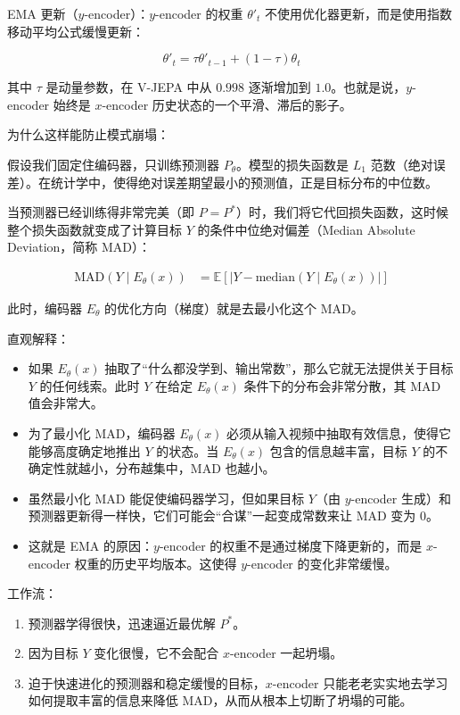 EMA 更新（\(y\)-encoder）：\(y\)-encoder 的权重 \(\theta'_t\) 不使用优化器更新，而是使用指数移动平均公式缓慢更新：

\[
\theta'_t=\tau\theta'_{t-1}+(1-\tau)\theta_t
\]

其中 \(\tau\) 是动量参数，在 V-JEPA 中从 \(0.998\) 逐渐增加到 \(1.0\)。也就是说，\(y\)-encoder 始终是 \(x\)-encoder 历史状态的一个平滑、滞后的影子。

为什么这样能防止模式崩塌：

假设我们固定住编码器，只训练预测器 \(P_\theta\)。模型的损失函数是 \(L_1\) 范数（绝对误差）。在统计学中，使得绝对误差期望最小的预测值，正是目标分布的中位数。

当预测器已经训练得非常完美（即 \(P=P^{*}\)）时，我们将它代回损失函数，这时候整个损失函数就变成了计算目标 \(Y\) 的条件中位绝对偏差（Median Absolute Deviation，简称 MAD）：

\[
\begin{aligned}
\mathrm{MAD}(Y\mid E_\theta(x))
&=
\mathbb{E}
\left[
\left|
Y-\mathrm{median}(Y\mid E_\theta(x))
\right|
\right]
\end{aligned}
\]

此时，编码器 \(E_\theta\) 的优化方向（梯度）就是去最小化这个 MAD。

直观解释：

\begin{itemize}
\tightlist
\item
  如果 \(E_\theta(x)\) 抽取了``什么都没学到、输出常数''，那么它就无法提供关于目标 \(Y\) 的任何线索。此时 \(Y\) 在给定 \(E_\theta(x)\) 条件下的分布会非常分散，其 MAD 值会非常大。
\item
  为了最小化 MAD，编码器 \(E_\theta(x)\) 必须从输入视频中抽取有效信息，使得它能够高度确定地推出 \(Y\) 的状态。当 \(E_\theta(x)\) 包含的信息越丰富，目标 \(Y\) 的不确定性就越小，分布越集中，MAD 也越小。
\item
  虽然最小化 MAD 能促使编码器学习，但如果目标 \(Y\)（由 \(y\)-encoder 生成）和预测器更新得一样快，它们可能会``合谋''一起变成常数来让 MAD 变为 \(0\)。
\item
  这就是 EMA 的原因：\(y\)-encoder 的权重不是通过梯度下降更新的，而是 \(x\)-encoder 权重的历史平均版本。这使得 \(y\)-encoder 的变化非常缓慢。
\end{itemize}

工作流：

\begin{enumerate}
\def\labelenumi{\arabic{enumi}.}
\tightlist
\item
  预测器学得很快，迅速逼近最优解 \(P^{*}\)。
\item
  因为目标 \(Y\) 变化很慢，它不会配合 \(x\)-encoder 一起坍塌。
\item
  迫于快速进化的预测器和稳定缓慢的目标，\(x\)-encoder 只能老老实实地去学习如何提取丰富的信息来降低 MAD，从而从根本上切断了坍塌的可能。
\end{enumerate}

